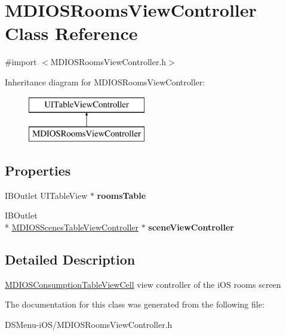 \hypertarget{interface_m_d_i_o_s_rooms_view_controller}{\section{M\-D\-I\-O\-S\-Rooms\-View\-Controller Class Reference}
\label{interface_m_d_i_o_s_rooms_view_controller}
}


{\ttfamily \#import $<$M\-D\-I\-O\-S\-Rooms\-View\-Controller.\-h$>$}

Inheritance diagram for M\-D\-I\-O\-S\-Rooms\-View\-Controller\-:\begin{figure}[H]
\begin{center}
\leavevmode
\includegraphics[height=2.000000cm]{interface_m_d_i_o_s_rooms_view_controller}
\end{center}
\end{figure}
\subsection*{Properties}
\begin{DoxyCompactItemize}
\item 
\hypertarget{interface_m_d_i_o_s_rooms_view_controller_a6eca9791feec2102637407809e683be8}{I\-B\-Outlet U\-I\-Table\-View $\ast$ {\bfseries rooms\-Table}}\label{interface_m_d_i_o_s_rooms_view_controller_a6eca9791feec2102637407809e683be8}

\item 
\hypertarget{interface_m_d_i_o_s_rooms_view_controller_acdafe15aadc3a9244d4df1ad881996e9}{I\-B\-Outlet \\*
\hyperlink{interface_m_d_i_o_s_scenes_table_view_controller}{M\-D\-I\-O\-S\-Scenes\-Table\-View\-Controller} $\ast$ {\bfseries scene\-View\-Controller}}\label{interface_m_d_i_o_s_rooms_view_controller_acdafe15aadc3a9244d4df1ad881996e9}

\end{DoxyCompactItemize}


\subsection{Detailed Description}
\hyperlink{interface_m_d_i_o_s_consumption_table_view_cell}{M\-D\-I\-O\-S\-Consumption\-Table\-View\-Cell} view controller of the i\-O\-S rooms screen 

The documentation for this class was generated from the following file\-:\begin{DoxyCompactItemize}
\item 
D\-S\-Menu-\/i\-O\-S/M\-D\-I\-O\-S\-Rooms\-View\-Controller.\-h\end{DoxyCompactItemize}
